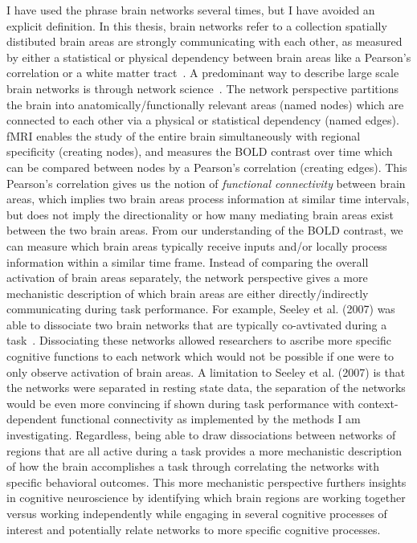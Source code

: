\documentclass[phd,appendix,figures]{uithesis}
\begin{document}
I have used the phrase brain networks several times, but I have avoided an explicit definition.
In this thesis, brain networks refer to a collection spatially distibuted brain areas
are strongly communicating with each other, as measured by either a
statistical or physical dependency between
brain areas like a Pearson's correlation or a white matter tract~\cite{Uddin2019}.
A predominant way to describe large scale brain networks is through network science~\cite{Rubinov2010}.
The network perspective partitions the brain into anatomically/functionally relevant areas (named nodes)
which are connected to each other via a physical or statistical dependency (named edges).
fMRI enables the study of the entire brain simultaneously with regional specificity (creating nodes),
and measures the BOLD contrast over time which can be compared between nodes by a Pearson's correlation (creating edges).
This Pearson's correlation gives us the notion of \textit{functional connectivity} between brain areas,
which implies two brain areas process information at similar time intervals, but does not imply
the directionality or how many mediating brain areas exist between the two brain areas.
From our understanding of the BOLD contrast, we can measure which brain areas
typically receive inputs and/or locally process information within a similar time frame.
Instead of comparing the overall activation of brain areas separately, the network perspective
gives a more mechanistic description of which brain areas are either directly/indirectly
communicating during task performance.
For example, Seeley et al. (2007) was able to dissociate two brain networks that are typically
co-avtivated during a task~\cite{Seeley2007}.
Dissociating these networks allowed researchers to ascribe more specific cognitive functions
to each network which would not be possible if one were to only observe activation of brain areas.
A limitation to Seeley et al. (2007) is that the networks were separated in resting state data,
the separation of the networks would be even more convincing if shown during task performance
with context-dependent functional connectivity as implemented by the methods I am
investigating.
Regardless, being able to draw dissociations between networks of regions that are all active
during a task provides a more mechanistic description of how the brain accomplishes a task
through correlating the networks with specific behavioral outcomes.
This more mechanistic perspective furthers insights in cognitive neuroscience by identifying
which brain regions are working together versus working independently while engaging
in several cognitive processes of interest and potentially relate networks to more specific
cognitive processes.
\end{document}
